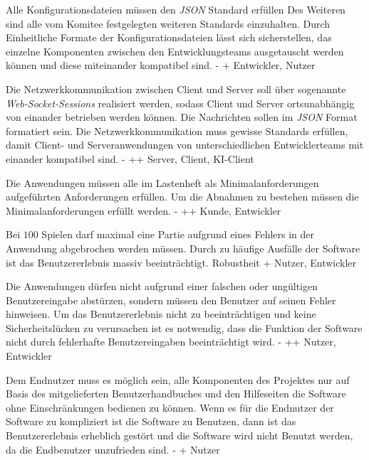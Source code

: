         {Alle Konfigurationsdateien müssen den \textit{JSON} Standard erfüllen Des Weiteren sind alle vom Komitee festgelegten weiteren Standards einzuhalten.}
        {Durch Einheitliche Formate der Konfigurationsdateien lässt sich sicherstellen, das einzelne Komponenten zwischen den Entwicklungsteams ausgetauscht werden können und diese miteinander kompatibel sind. }
        {-}
        {+}
        {Entwickler, Nutzer}

        {Die Netzwerkkommunikation zwischen Client und Server soll über sogenannte \textit{Web-Socket-Sessions} realisiert werden, sodass Client und Server ortsunabhängig von einander betrieben werden können. Die Nachrichten sollen im \textit{JSON} Format formatiert sein.}
        {Die Netzwerkkommunikation muss gewisse Standards erfüllen, damit Client- und Serveranwendungen von unterschiedlichen Entwicklerteams mit einander kompatibel sind.}
        {-}
        {++}
        {Server, Client, KI-Client}

        {Die Anwendungen müssen alle im Lastenheft als Minimalanforderungen aufgeführten Anforderungen erfüllen.}
        {Um die Abnahmen zu bestehen müssen die Minimalanforderungen erfüllt werden.}
        {-}
        {++}
        {Kunde, Entwickler}

        {Bei $100$ Spielen darf maximal eine Partie aufgrund eines Fehlers in der Anwendung abgebrochen werden müssen.}
        {Durch zu häufige Ausfälle der Software ist das Benutzererlebnis massiv beeinträchtigt.}
        {Robustheit}
        {+}
        {Nutzer, Entwickler}

        {Die Anwendungen dürfen nicht aufgrund einer falschen oder ungültigen Benutzereingabe abstürzen, sondern müssen den Benutzer auf seinen Fehler hinweisen.}
        {Um das Benutzererlebnis nicht zu beeinträchtigen und keine Sicherheitslücken zu verursachen ist es notwendig, dass die Funktion der Software nicht durch fehlerhafte Benutzereingaben beeinträchtigt wird.}
        {-}
        {++}
        {Nutzer, Entwickler}

        {Dem Endnutzer muss es möglich sein, alle Komponenten des Projektes nur auf Basis des mitgelieferten Benutzerhandbuches und den Hilfeseiten die Software ohne Einschränkungen bedienen zu können.}
        {Wenn es für die Endnutzer der Software zu kompliziert ist die Software zu Benutzen, dann ist das Benutzererlebnis erheblich gestört und die Software wird nicht Benutzt werden, da die Endbenutzer unzufrieden sind.}
        {-}
        {+}
        {Nutzer}
        
